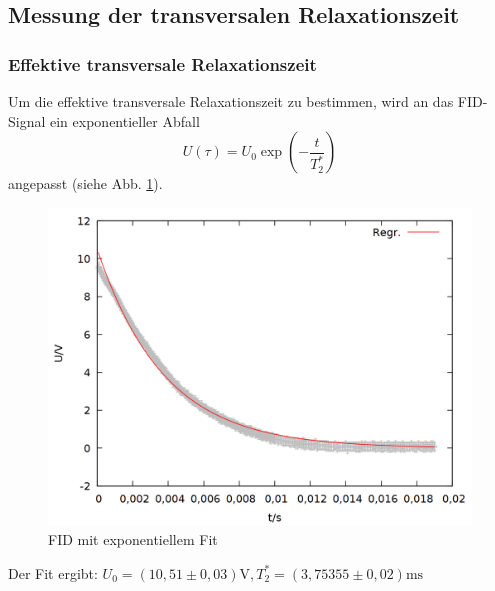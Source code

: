 
\subsection{Messung der transversalen Relaxationszeit}
\subsubsection{Effektive transversale Relaxationszeit}
Um die effektive transversale Relaxationszeit zu bestimmen, wird an das FID-Signal ein exponentieller Abfall $$U(\tau) = U_0\exp{\left(-\frac{t}{T_2^*}\right)}$$ angepasst (siehe Abb. \ref{fig:hahn_fid}).

\begin{figure}[h]
\centering
\includegraphics[width=0.75\linewidth]{data/p402_443_data/hahn_sequenz/out_fid.png}
\caption{FID mit exponentiellem Fit}
\label{fig:hahn_fid}
\end{figure}

Der Fit ergibt: $U_0 = (10,51\pm 0,03)\si{\volt}, T_2^* = (3,75355\pm 0,02) \si{\milli\second}$ 

